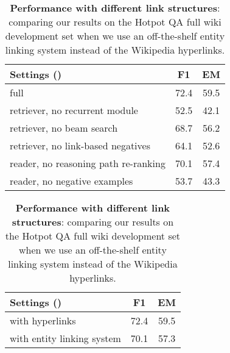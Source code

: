 \documentclass{article} \usepackage{iclr2020_conference,times}
\begin{document}
\begin{table}[!tb]
\begin{minipage}{.50\linewidth}
\vspace{-0.3cm}
    \centering
    \small{
\begin{tabular}{ l | c | c }\toprule 
  Settings () & F1 & EM \\
  \midrule
full & 72.4 & 59.5 \\\hdashline
retriever, no recurrent module & 52.5 & 42.1 \\
retriever, no beam search &  68.7 & 56.2 \\
retriever, no link-based negatives  & 64.1  &  52.6 \\ 
\hline
reader, no reasoning path re-ranking  & 70.1 & 57.4 \\
reader, no negative examples  & 53.7 & 43.3  \\
\bottomrule
\end{tabular}
\caption{{\bf Ablation study}: evaluating different variants of our model on HotpotQA full wiki.
}\label{tab:ablation_study}
    }
\end{minipage}
\hspace{2mm}
\begin{minipage}{.45\linewidth}
\vspace{-0.6cm}
    \centering
    \small{
\begin{tabular}{ l | c | c }\toprule 
  Settings () & F1 & EM \\
  \midrule
with hyperlinks & 72.4 & 59.5 \\\hdashline
with entity linking system & 70.1 & 57.3  \\
\bottomrule
\end{tabular}
\caption{{\bf Performance with different link structures}: comparing our results on the Hotpot QA full wiki development set when we use an off-the-shelf entity linking system instead of the Wikipedia hyperlinks.
}\label{tab:entity_link}
    }
\end{minipage}
\end{table}
\end{document}
